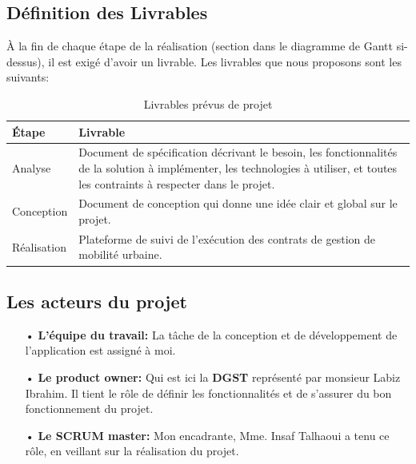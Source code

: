 \documentclass[a4paper]{report}
\begin{document}
\begin{doublespace}
	\subsection{Définition des Livrables}
	À la fin de chaque étape de la réalisation
	(section dans le diagramme de Gantt si-dessus),
	il est exigé d'avoir un livrable.
	Les livrables que nous proposons sont les suivants:
	\begin{table}[H]
		\begin{center}
			\begin{tabularx}{17.5cm}{|p{2cm}|X|}
				\hline
				\textbf{Étape} & \textbf{Livrable}                                                                                                                                                                  \\
				\hline
				Analyse        & Document de spécification décrivant le besoin, les fonctionnalités de la solution à implémenter, les technologies à utiliser, et toutes les contraints à respecter dans le projet. \\
				\hline
				Conception     & Document de conception qui donne une idée clair et global sur le projet.                                                                                                           \\
				\hline
				Réalisation    & Plateforme de suivi de l’exécution des contrats de gestion de mobilité urbaine.                                                                                                    \\
				\hline
			\end{tabularx}
			\caption{Livrables prévus de projet}
		\end{center}
	\end{table}
	\subsection{Les acteurs du projet}
	\begin{itemize}
		\item[•] \textbf{L’équipe du travail:} La tâche de la conception et de développement de l’application est assigné à moi.
		\item[•] \textbf{Le product owner:} Qui est ici la \textbf{DGST} représenté par monsieur Labiz Ibrahim. Il tient le rôle de définir les fonctionnalités et de s’assurer du bon fonctionnement du projet.
		\item[•] \textbf{Le SCRUM master:} Mon encadrante, Mme. Insaf Talhaoui a tenu ce rôle, en veillant sur la réalisation du projet.
	\end{itemize}

\end{doublespace}
\end{document}
